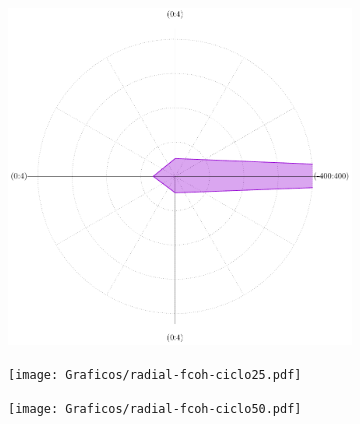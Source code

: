 \begin{figure}[t!]
\begin{subfigure}[t]{0.325\textwidth}
			        	\includegraphics[width=\textwidth]{Graficos/radial-fcoh-ciclo1.pdf}
			     		\end{subfigure}
		     		\begin{subfigure}[t]{0.325\textwidth}
			        	\hspace*{0.5mm}\texttt{[image: Graficos/radial-fcoh-ciclo25.pdf]}
			     		\end{subfigure}
		     		\begin{subfigure}[t]{0.325\textwidth}
			        	\hspace*{1mm}\texttt{[image: Graficos/radial-fcoh-ciclo50.pdf]}
			     		\end{subfigure}	
		     		\label{fig:preconcentraciones}
		      	   	\end{figure} 